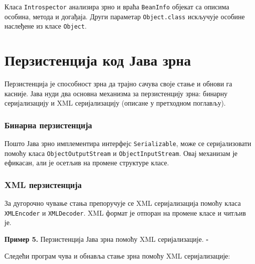 Класа \texttt{Introspector} анализира зрно и враћа \texttt{BeanInfo} објекат са описима особина, метода и догађаја. Други параметар \texttt{Object.class} искључује особине наслеђене из класе \texttt{Object}.


\section{Перзистенција код Јава зрна}

Перзистенција је способност зрна да трајно сачува своје стање и обнови га касније. Јава нуди два основна механизма за перзистенцију зрна: бинарну серијализацију и XML серијализацију (описане у претходном поглављу).


\subsubsection{Бинарна перзистенција}

Пошто Јава зрно имплементира интерфејс \texttt{Serializable}, може се серијализовати помоћу класа \texttt{ObjectOutputStream} и \texttt{ObjectInputStream}. Овај механизам је ефикасан, али је осетљив на промене структуре класе.


\subsubsection{XML перзистенција}

За дугорочно чување стања препоручује се XML серијализација помоћу класа \texttt{XMLEncoder} и \texttt{XMLDecoder}. XML формат је отпоран на промене класе и читљив је.


\bigskip

\noindent \textbf{Пример 5.} Перзистенција Јава зрна помоћу XML серијализације. $\square$

\medskip

Следећи програм чува и обнавља стање зрна помоћу XML серијализације:


